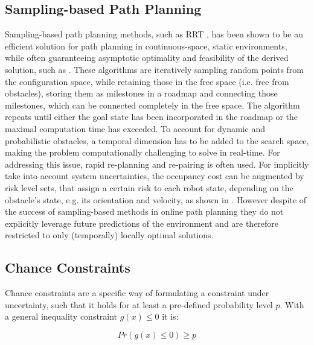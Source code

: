 \subsection{Sampling-based Path Planning}
Sampling-based path planning methods, such as RRT \cite{LaValle1998}, has been shown to be an efficient solution for path planning in continuous-space, static environments, while often guaranteeing asymptotic optimality and feasibility of the derived solution, such as \cite{Karaman2011}\cite{Luders}. These algorithms are iteratively sampling random points from the configuration space, while retaining those in the free space (i.e. free from obstacles), storing them as milestones in a roadmap and connecting those milestones, which can be connected completely in the free space. The algorithm repeats until either the goal state has been incorporated in the roadmap or the maximal computation time has exceeded. To account for dynamic and probabilistic obstacles, a temporal dimension has to be added to the search space, making the problem computationally challenging to solve in real-time. For addressing this issue, rapid re-planning and re-pairing \cite{Otte2014} is often used. For implicitly take into account system uncertainties, the occupancy cost can be augmented by risk level sets, that assign a certain risk to each robot state, depending on the obstacle's state, e.g. its orientation and velocity, as shown in \cite{Pierson2018}\cite{Pierson2019}. However despite of the success of sampling-based methods in online path planning they do not explicitly leverage future predictions of the environment and are therefore restricted to only (temporally) locally optimal solutions.

\subsection{Chance Constraints}
Chance constraints are a specific way of formulating a constraint under uncertainty, such that it holds for at least a pre-defined probability level $p$. With a general inequality constraint $g(x) \leq 0$ it is:

\begin{equation}
Pr(g(x) \leq 0) \geq p
\label{eq:chance_constraint}
\end{equation}

